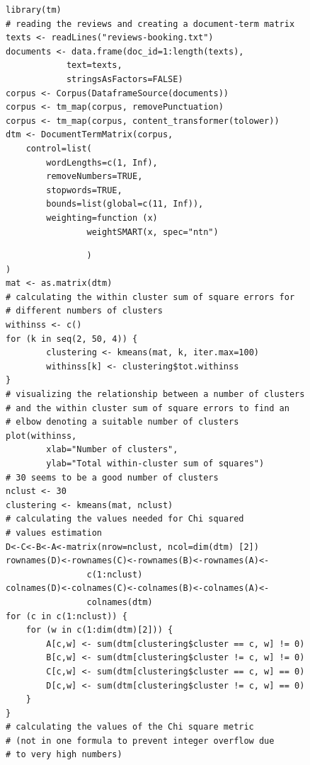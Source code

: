 \documentclass[10pt]{book}
\begin{document}
\begin{verbatim}
library(tm)
# reading the reviews and creating a document-term matrix
texts <- readLines("reviews-booking.txt")
documents <- data.frame(doc_id=1:length(texts),
            text=texts,
            stringsAsFactors=FALSE)
corpus <- Corpus(DataframeSource(documents))
corpus <- tm_map(corpus, removePunctuation)
corpus <- tm_map(corpus, content_transformer(tolower))
dtm <- DocumentTermMatrix(corpus,
    control=list(
        wordLengths=c(1, Inf),
        removeNumbers=TRUE,
        stopwords=TRUE,
        bounds=list(global=c(11, Inf)),
        weighting=function (x)
                weightSMART(x, spec="ntn")
\end{verbatim}

\begin{verbatim}
                )
)
mat <- as.matrix(dtm)
# calculating the within cluster sum of square errors for
# different numbers of clusters
withinss <- c()
for (k in seq(2, 50, 4)) {
        clustering <- kmeans(mat, k, iter.max=100)
        withinss[k] <- clustering$tot.withinss
}
# visualizing the relationship between a number of clusters
# and the within cluster sum of square errors to find an
# elbow denoting a suitable number of clusters
plot(withinss,
        xlab="Number of clusters",
        ylab="Total within-cluster sum of squares")
# 30 seems to be a good number of clusters
nclust <- 30
clustering <- kmeans(mat, nclust)
# calculating the values needed for Chi squared
# values estimation
D<-C<-B<-A<-matrix(nrow=nclust, ncol=dim(dtm) [2])
rownames(D)<-rownames(C)<-rownames(B)<-rownames(A)<-
                c(1:nclust)
colnames(D)<-colnames(C)<-colnames(B)<-colnames(A)<-
                colnames(dtm)
for (c in c(1:nclust)) {
    for (w in c(1:dim(dtm)[2])) {
        A[c,w] <- sum(dtm[clustering$cluster == c, w] != 0)
        B[c,w] <- sum(dtm[clustering$cluster != c, w] != 0)
        C[c,w] <- sum(dtm[clustering$cluster == c, w] == 0)
        D[c,w] <- sum(dtm[clustering$cluster != c, w] == 0)
    }
}
# calculating the values of the Chi square metric
# (not in one formula to prevent integer overflow due
# to very high numbers)
\end{verbatim}
\end{document}

